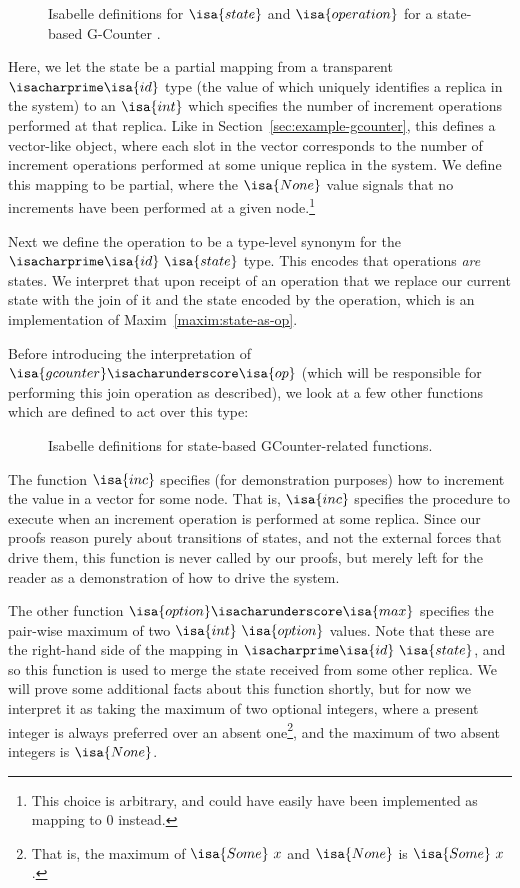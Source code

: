 \begin{figure}[H]
  
  \caption{Isabelle definitions for $\isa{state}$ and $\isa{operation}$ for a
    state-based G-Counter \CRDT.}
\end{figure}

Here, we let the state be a partial mapping from a transparent
$\isacharprime\isa{id}$ type (the value of which uniquely identifies a replica
in the system) to an $\isa{int}$ which specifies the number of increment
operations performed at that replica. Like in
Section~\ref{sec:example-gcounter}, this defines a vector-like object, where
each slot in the vector corresponds to the number of increment operations
performed at some unique replica in the system. We define this mapping to be
partial, where the $\isa{None}$ value signals that no increments have been
performed at a given node.\footnote{This choice is arbitrary, and could have
easily have been implemented as mapping to $0$ instead.}

Next we define the operation to be a type-level synonym for the
$\isacharprime\isa{id}~\isa{state}$ type. This encodes that operations
\emph{are} states. We interpret that upon receipt of an operation that we
replace our current state with the join of it and the state encoded by the
operation, which is an implementation of Maxim~\ref{maxim:state-as-op}.

Before introducing the interpretation of
$\isa{gcounter}\isacharunderscore\isa{op}$ (which will be responsible for
performing this join operation as described), we look at a few other functions
which are defined to act over this type:

\begin{figure}[H]
  
  \caption{Isabelle definitions for state-based GCounter-related functions.}
  \label{fig:gcounter-option-max}
\end{figure}

The function $\isa{inc}$ specifies (for demonstration purposes) how to increment
the value in a vector for some node. That is, $\isa{inc}$ specifies the
procedure to execute when an increment operation is performed at some replica.
Since our proofs reason purely about transitions of states, and not the external
forces that drive them, this function is never called by our proofs, but merely
left for the reader as a demonstration of how to drive the system.

The other function $\isa{option}\isacharunderscore\isa{max}$ specifies the
pair-wise maximum of two $\isa{int}~\isa{option}$ values. Note that these are
the right-hand side of the mapping in $\isacharprime\isa{id}~\isa{state}$, and
so this function is used to merge the state received from some other replica.
We will prove some additional facts about this function shortly, but for now we
interpret it as taking the maximum of two optional integers, where a present
integer is always preferred over an absent one\footnote{That is, the maximum of
$\isa{Some}~x$ and $\isa{None}$ is $\isa{Some}~x$.}, and the maximum of two
absent integers is $\isa{None}$.

